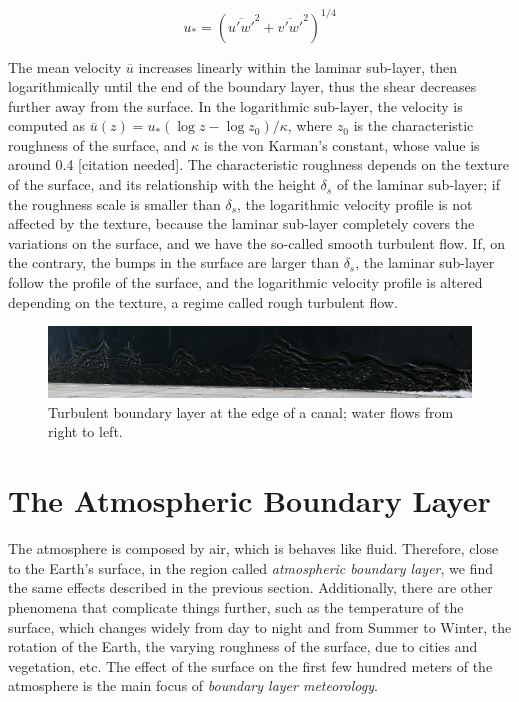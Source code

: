 \documentclass[a4paper]{book}
\begin{document}
\begin{equation}
\label{eq:ustar_momentum}
u_*=\left(\overline{u'w'}^2+\overline{v'w'}^2\right)^{1/4}
\end{equation}

The mean velocity $\overline{u}$ increases linearly within the laminar sub-layer, then logarithmically until the end of the boundary layer, thus the shear decreases further away from the surface. In the logarithmic sub-layer, the velocity is computed as $\overline{u}(z)=u_*(\log z - \log z_0)/\kappa$, where $z_0$ is the characteristic roughness of the surface, and $\kappa$ is the von Karman's constant, whose value is around 0.4 [citation needed]. The characteristic roughness depends on the texture of the surface, and its relationship with the height $\delta_s$ of the laminar sub-layer; if the roughness scale is smaller than $\delta_s$, the logarithmic velocity profile is not affected by the texture, because the laminar sub-layer completely covers the variations on the surface, and we have the so-called smooth turbulent flow. If, on the contrary, the bumps in the surface are larger than $\delta_s$, the laminar sub-layer follow the profile of the surface, and the logarithmic velocity profile is altered depending on the texture, a regime called rough turbulent flow.

\begin{figure}
\caption{Turbulent boundary layer at the edge of a canal; water flows from right to left.}
\label{fig:bl}
\centering
\includegraphics[width=\textwidth]{images/bl}
\end{figure}

\section{The Atmospheric Boundary Layer}
\label{sec:abl}
The atmosphere is composed by air, which is behaves like fluid. Therefore, close to the Earth's surface, in the region called \emph{atmospheric boundary layer}, we find the same effects described in the previous section. Additionally, there are other phenomena that complicate things further, such as the temperature of the surface, which changes widely from day to night and from Summer to Winter, the rotation of the Earth, the varying roughness of the surface, due to cities and vegetation, etc. The effect of the surface on the first few hundred meters of the atmosphere is the main focus of \emph{boundary layer meteorology}. 
\end{document}

